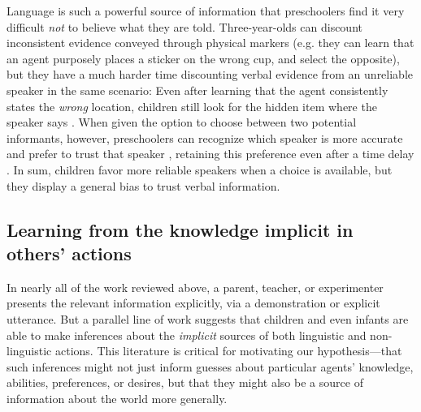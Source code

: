\documentclass[man]{apa2}
\begin{document}
Language is such a powerful source of information that preschoolers find it very difficult \emph{not} to believe what they are told.  Three-year-olds can discount inconsistent evidence conveyed through physical markers (e.g. they can learn that an agent purposely places a sticker on the wrong cup, and select the opposite), but they have a much harder time discounting verbal evidence from an unreliable speaker in the same scenario: Even after learning that the agent consistently states the \emph{wrong} location, children still look for the hidden item where the speaker says \cite{jaswal2010}.  When given the option to choose between two potential informants, however, preschoolers can recognize which speaker is more accurate and prefer to trust that speaker \cite{pasquini2007}, retaining this preference even after a time delay \cite{corriveau2009}.  In sum, children favor more reliable speakers when a choice is available, but they display a general bias to trust verbal information.







\subsection{Learning from the knowledge implicit in others' actions}


In nearly all of the work reviewed above, a parent, teacher, or experimenter presents the relevant information explicitly, via a demonstration or explicit utterance. But a parallel line of work suggests that children and even infants are able to make inferences about the \emph{implicit} sources of both linguistic and non-linguistic actions. This literature is critical for motivating our hypothesis---that such inferences might not just inform guesses about particular agents' knowledge, abilities, preferences, or desires, but that they might also be a source of information about the world more generally. 
\end{document}
